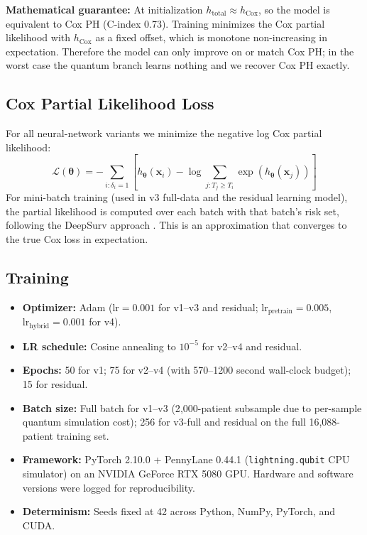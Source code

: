 \documentclass[12pt, letterpaper]{article}
\begin{document}
\textbf{Mathematical guarantee:} At initialization $h_{\text{total}} \approx h_{\text{Cox}}$, so the model is equivalent to Cox PH (C-index 0.73). Training minimizes the Cox partial likelihood with $h_{\text{Cox}}$ as a fixed offset, which is monotone non-increasing in expectation. Therefore the model can only improve on or match Cox PH; in the worst case the quantum branch learns nothing and we recover Cox PH exactly.

\subsection{Cox Partial Likelihood Loss}
For all neural-network variants we minimize the negative log Cox partial likelihood:
\[
\mathcal{L}(\boldsymbol{\theta}) = -\sum_{i: \delta_i = 1} \left[ h_{\boldsymbol{\theta}}(\mathbf{x}_i) - \log \sum_{j: T_j \geq T_i} \exp(h_{\boldsymbol{\theta}}(\mathbf{x}_j)) \right]
\]
For mini-batch training (used in v3 full-data and the residual learning model), the partial likelihood is computed over each batch with that batch's risk set, following the DeepSurv approach \citep{katzman2018}. This is an approximation that converges to the true Cox loss in expectation.

\subsection{Training}
\begin{itemize}
    \item \textbf{Optimizer:} Adam ($\text{lr} = 0.001$ for v1--v3 and residual; $\text{lr}_{\text{pretrain}} = 0.005$, $\text{lr}_{\text{hybrid}} = 0.001$ for v4).
    \item \textbf{LR schedule:} Cosine annealing to $10^{-5}$ for v2--v4 and residual.
    \item \textbf{Epochs:} 50 for v1; 75 for v2--v4 (with 570--1200 second wall-clock budget); 15 for residual.
    \item \textbf{Batch size:} Full batch for v1--v3 (2{,}000-patient subsample due to per-sample quantum simulation cost); 256 for v3-full and residual on the full 16{,}088-patient training set.
    \item \textbf{Framework:} PyTorch 2.10.0 + PennyLane 0.44.1 (\texttt{lightning.qubit} CPU simulator) on an NVIDIA GeForce RTX 5080 GPU. Hardware and software versions were logged for reproducibility.
    \item \textbf{Determinism:} Seeds fixed at 42 across Python, NumPy, PyTorch, and CUDA.
\end{itemize}
\end{document}
